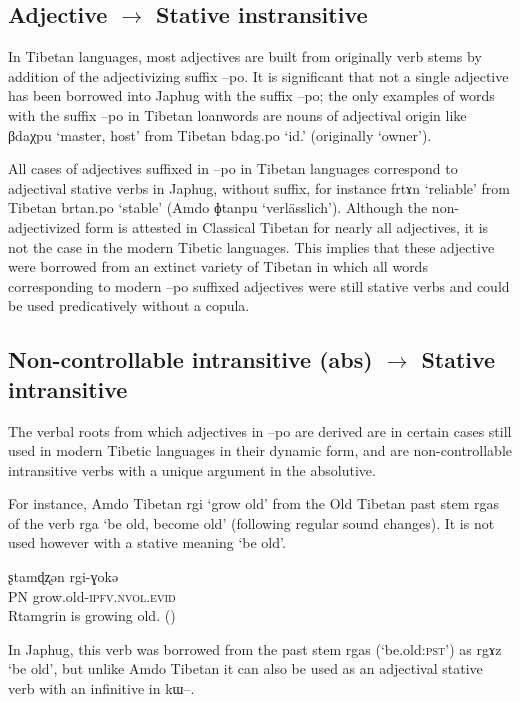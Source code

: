 \documentclass[oldfontcommands,oneside,a4paper,11pt]{article}
\newcommand{\ipa}[1]{{\phon \mbox{#1}}} %
\begin{document}
  \subsection{Adjective $\rightarrow$ Stative instransitive}  
In Tibetan languages, most adjectives are built from originally verb stems by addition of the adjectivizing suffix \ipa{--po}. It is significant that not a single adjective has been borrowed into Japhug with the suffix \ipa{--po}; the only examples of words with the suffix \ipa{--po} in Tibetan loanwords are nouns of adjectival origin like \ipa{βdaχpu} `master, host' from Tibetan \ipa{bdag.po} `id.' (originally `owner').

All cases of adjectives suffixed in \ipa{--po} in Tibetan languages correspond to adjectival stative verbs in Japhug, without suffix, for instance   \ipa{frtɤn} `reliable' from Tibetan \ipa{brtan.po} `stable' (Amdo \ipa{ɸtanpu} `verlässlich'). Although the non-adjectivized form is attested in Classical Tibetan for nearly all adjectives, it is not the case in the modern Tibetic languages. This implies that these adjective were borrowed from an extinct variety of Tibetan in which all words corresponding to modern \ipa{--po} suffixed adjectives were still stative verbs and could be used predicatively without a copula.

  
\subsection{Non-controllable intransitive (abs) $\rightarrow$ Stative intransitive}
The verbal roots from which adjectives in \ipa{--po} are derived are in certain cases still used in modern Tibetic languages in their dynamic form, and are non-controllable intransitive verbs with a unique argument in the absolutive.

For instance, Amdo Tibetan \ipa{rgi} `grow old' from the Old Tibetan past stem \ipa{rgas} of the verb \ipa{rga} `be old, become old' (following regular sound changes). It is not used however with a stative meaning `be old'.

\begin{exe}
\ex \label{ex:rgi}
\gll
\ipa{ʂtamɖʐən} 	\ipa{rgi-ɣokə}  	 \\
PN grow.old-\textsc{ipfv.nvol.evid} \\
\glt Rtamgrin is growing old. (\citealt[123:548]{haller04themchen})
\end{exe}

In Japhug, this verb was borrowed from the past stem \ipa{rgas} (`be.old:\textsc{pst}') as \ipa{rgɤz} `be old', but unlike Amdo Tibetan it can also be used as an adjectival stative verb with an infinitive in \ipa{kɯ--}. 
\end{document}

